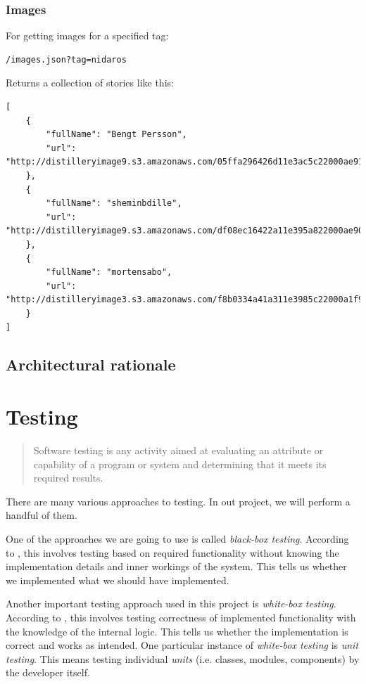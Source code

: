 \documentclass[11pt]{book}
\begin{document}
\subsection{Images}
For getting images for a specified tag:
\begin{lstlisting}[frame=single]
/images.json?tag=nidaros
\end{lstlisting}
Returns a collection of stories like this:
\begin{lstlisting}[frame=single]
[
    {
        "fullName": "Bengt Persson",
        "url": "http://distilleryimage9.s3.amazonaws.com/05ffa296426d11e3ac5c22000ae91269_8.jpg"
    },
    {
        "fullName": "sheminbdille",
        "url": "http://distilleryimage9.s3.amazonaws.com/df08ec16422a11e395a822000ae90d43_7.jpg"
    },
    {
        "fullName": "mortensabo",
        "url": "http://distilleryimage3.s3.amazonaws.com/f8b0334a41a311e3985c22000a1f9ad3_8.jpg"
    }
]
\end{lstlisting}

\section{Architectural rationale}


\chapter{Testing}

\begin{quotation}\noindent
Software testing is any activity aimed at evaluating an attribute or capability of a program or system and determining that it meets its required results. \cite{pan}
\end{quotation}

There are many various approaches to testing. In out project, we will perform a handful of them.

One of the approaches we are going to use is called \emph{black-box testing}. According to \cite{shinde}, this involves testing based on required functionality without knowing the implementation details and inner workings of the system. This tells us whether we implemented what we should have implemented.

Another important testing approach used in this project is \emph{white-box testing}. According to \cite{shinde}, this involves testing correctness of implemented functionality with the knowledge of the internal logic. This tells us whether the implementation is correct and works as intended. One particular instance of \emph{white-box testing} is \emph{unit testing}. This means testing individual \emph{units} (i.e. classes, modules, components) by the developer itself.
\end{document}
